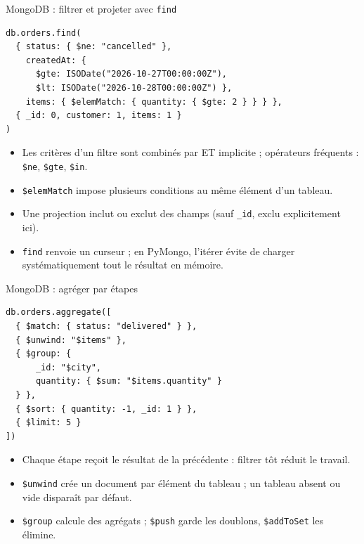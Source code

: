 \begin{frame}[fragile]{MongoDB : filtrer et projeter avec \texttt{find}}
    \begin{verbatim}
db.orders.find(
  { status: { $ne: "cancelled" },
    createdAt: {
      $gte: ISODate("2026-10-27T00:00:00Z"),
      $lt: ISODate("2026-10-28T00:00:00Z") },
    items: { $elemMatch: { quantity: { $gte: 2 } } } },
  { _id: 0, customer: 1, items: 1 }
)
\end{verbatim}
    \begin{itemize}
        \item Les critères d'un filtre sont combinés par ET implicite ;
              opérateurs fréquents : \texttt{\$ne}, \texttt{\$gte},
              \texttt{\$in}.
        \item \texttt{\$elemMatch} impose plusieurs conditions au même élément
              d'un tableau.
        \item Une projection inclut ou exclut des champs (sauf \texttt{\_id},
              exclu explicitement ici).
        \item \texttt{find} renvoie un curseur ; en PyMongo, l'itérer évite de
              charger systématiquement tout le résultat en mémoire.
    \end{itemize}
\end{frame}

\begin{frame}[fragile]{MongoDB : agréger par étapes}
    \begin{verbatim}
db.orders.aggregate([
  { $match: { status: "delivered" } },
  { $unwind: "$items" },
  { $group: {
      _id: "$city",
      quantity: { $sum: "$items.quantity" }
  } },
  { $sort: { quantity: -1, _id: 1 } },
  { $limit: 5 }
])
\end{verbatim}
    \begin{itemize}
        \item Chaque étape reçoit le résultat de la précédente : filtrer tôt
              réduit le travail.
        \item \texttt{\$unwind} crée un document par élément du tableau ; un
              tableau absent ou vide disparaît par défaut.
        \item \texttt{\$group} calcule des agrégats ; \texttt{\$push} garde les
              doublons, \texttt{\$addToSet} les élimine.
    \end{itemize}
\end{frame}

